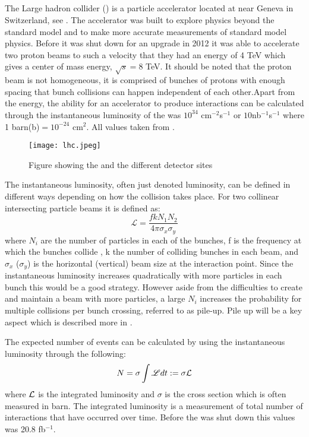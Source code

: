 \subsection{\abbrLHC}
The Large hadron collider (\abbrLHC) is a particle accelerator located at \abbrCERN near Geneva in Switzerland, see . The accelerator was built to explore physics beyond the standard model and to make more accurate measurements of standard model physics. Before it was shut down for an upgrade in 2012 it was able to accelerate two proton beams to such a velocity that they had an energy of 4 TeV which gives a center of mass energy, $\sqrt{s}=8$ TeV. It should be noted that the proton beam is not homogeneous, it is comprised of bunches of protons with enough spacing that bunch collisions can happen independent of each other.Apart from the energy, the ability for an accelerator to produce interactions can be calculated through the instantaneous luminosity of the \abbrLHC was $10^{34}$ cm$^{-2}$s$^{-1}$ or $10$nb$^{-1}$s$^{-1}$ where 1 barn(b)$=10^{-24}$ cm$^2$. All values taken from \citep{lumires}.
\begin{figure}[H]
\begin{center}
\texttt{[image: lhc.jpeg]}
\caption{Figure showing the \abbrLHC and the different detector sites\citep{lhcimage}}
\label{fig:lhc}
\end{center}
\end{figure}
The instantaneous luminosity, often just denoted luminosity, can be defined in different ways depending on how the collision takes place. For two collinear intersecting particle beams it is defined as:
\begin{equation}
\mathscr{L} = \frac{fkN_1 N_2}{4\pi \sigma_x \sigma_y}
\end{equation}
where $N_i$ are the number of particles in each of the bunches, f is the frequency at which the bunches collide , k the number of colliding bunches in each beam, and $\sigma_x$ ($\sigma_y$) is the horizontal (vertical) beam size at the interaction point. Since the instantaneous luminosity increases quadratically with more particles in each bunch this would be a good strategy. However aside from the difficulties to create and maintain a beam with more particles, a large $N_i$ increases the probability for multiple collisions per bunch crossing, referred to as pile-up. Pile up will be a key aspect which is described more in . 

The expected number of events can be calculated by using the instantaneous luminosity through the following:
\begin{equation}
N=\sigma \int \mathscr{L} dt := \sigma \mathcal{L}
\end{equation}
where $\mathcal{L}$ is the integrated luminosity and $\sigma$ is the cross section which is often measured in barn.
The integrated luminosity is a measurement of total number of interactions that have occurred over time. Before the \abbrLHC was shut down this values was 20.8 fb$^{-1}$.

